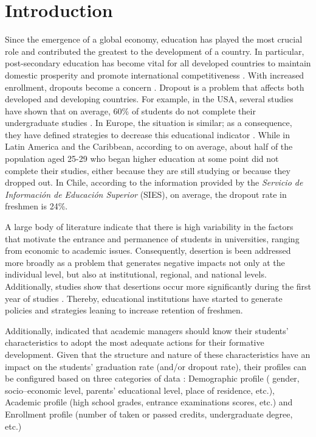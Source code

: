 \documentclass[5p,authoryear,preprint,12pt]{elsarticle}
\begin{document}
\section{Introduction}

Since the emergence of a global economy, education has played the most crucial role and contributed the greatest to the development of a country. In particular, post-secondary education has become vital for all developed countries to maintain domestic prosperity and promote international competitiveness \citep{ma2013profiles}. With increased enrollment, dropouts become a concern \citep{ma2013profiles}. Dropout is a problem that affects both developed and developing countries. For example, in the USA, several studies have shown that on average, 60\% of students do not complete their undergraduate studies \citep{shapiro2015completing, mcfarland2019condition}. In Europe, the situation is similar; as a consequence, they have defined strategies to decrease this educational indicator \citep{vossensteyn2015dropout}. While in Latin America and the Caribbean, according to \citet{marta2017crossroads} on average, about half of the population aged 25-29 who began higher education at some point did not complete their studies, either because they are still studying or because they dropped out. In Chile, according to the information provided by the \emph{Servicio de Información de Educación Superior} (SIES), on average, the dropout rate in freshmen is 24\%. 

A large body of literature \citep{sanchez2005using, donoso2007analisis, chacon2012analytics, miranda2017analisis} indicate that there is high variability in the factors that motivate the entrance and permanence of students in universities, ranging from economic to academic issues. Consequently, desertion is been addressed more broadly as a problem that generates negative impacts not only at the individual level, but also at institutional, regional, and national levels. Additionally, studies show that desertions occur more significantly during the first year of studies \citep{donoso2007analisis,gonzalez2018estimaciones}. Thereby, educational institutions have started to generate policies and strategies leaning to increase retention of freshmen.

Additionally, \citet{braxton2005theoretical} indicated that academic managers should know their students' characteristics to adopt the most adequate actions for their formative development. Given that the structure and nature of these characteristics have an impact on the students' graduation rate (and/or dropout rate), their profiles can be configured based on three categories of data \citep{gianoutsos2011comparing}: Demographic profile ( gender, socio--economic level, parents' educational level, place of residence, etc.), Academic profile (high school grades, entrance examinations scores, etc.) and Enrollment profile (number of taken or passed credits, undergraduate degree, etc.)
\end{document}
